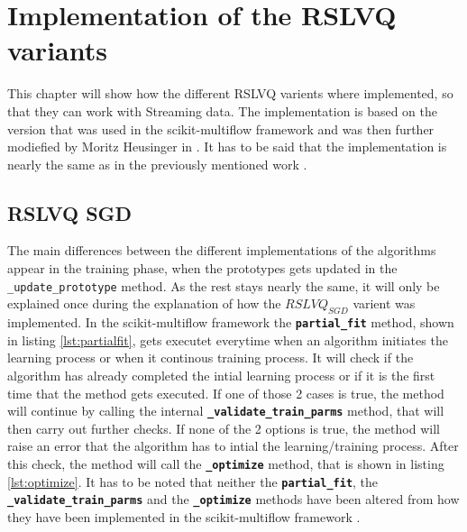 \documentclass[12pt,oneside,a4paper,parskip]{scrbook}
\begin{document}
\section{Implementation of the RSLVQ variants}
This chapter will show how the different RSLVQ varients where implemented, so that they can work with Streaming data.
The implementation is based on the version that was used in the scikit-multiflow framework \cite{skmultiflow} and was then further 
modiefied by Moritz Heusinger in \cite{PassiveDriftonRSLVQ}.
It has to be said that the implementation is nearly the same as in the previously mentioned work \cite{PassiveDriftonRSLVQ}.

\subsection{RSLVQ SGD}
The main differences between the different implementations of the algorithms appear in the training phase, when the prototypes
gets updated in the \texttt{\_update\_prototype} method. As the rest stays nearly the same, it will only be explained once during the explanation of how the $RSLVQ_\textit{SGD}$
varient was implemented.
In the scikit-multiflow framework the \textbf{\texttt{partial\_fit}} method, shown in listing \ref{lst:partialfit}, gets executet everytime when an algorithm initiates the
learning process or when it continous training process. It will check if the algorithm has already completed the intial 
learning process or if it is the first time that the method gets executed. If one of those 2 cases is true, the method will
continue by calling the internal \textbf{\texttt{\_validate\_train\_parms}} method, that will then carry out further checks.
If none of the 2 options is true, the method will raise an error that the algorithm has to intial the learning/training process.
After this check, the method will call the \textbf{\texttt{\_optimize}} method, that is shown in listing \ref{lst:optimize}.
It has to be noted that neither the \textbf{\texttt{partial\_fit}}, the \textbf{\texttt{\_validate\_train\_parms}} and the \textbf{\texttt{\_optimize}} methods
have been altered from how they have been implemented in the scikit-multiflow framework \cite{skmultiflow}.
\end{document}
